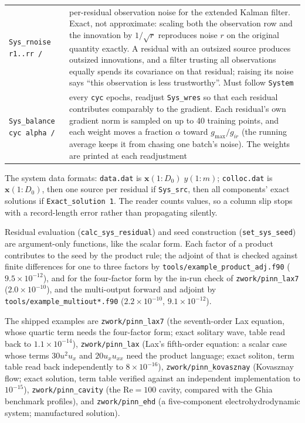 \documentclass[10pt,a4paper]{article}
\newcommand{\code}[1]{\texttt{#1}}
\newcommand{\mi}[1]{\boldsymbol{#1}}
\begin{document}
\begin{longtable}{@{}p{}p{}@{}}
\code{Sys\_rnoise r1..rr /} & per-residual observation noise for the extended Kalman filter. Exact, not approximate: scaling both the observation row and the innovation by $1/\sqrt{r}$ reproduces noise $r$ on the original quantity exactly. A residual with an outsized source produces outsized innovations, and a filter trusting all observations equally spends its covariance on that residual; raising its noise says ``this observation is less trustworthy''. Must follow \code{System}\\
\code{Sys\_balance cyc alpha /} & every \code{cyc} epochs, readjust \code{Sys\_wres} so that each residual contributes comparably to the gradient. Each residual's own gradient norm is sampled on up to 40 training points, and each weight moves a fraction $\alpha$ toward $g_{\max}/g_{ir}$ (the running average keeps it from chasing one batch's noise). The weights are printed at each readjustment\\
\bottomrule
\end{longtable}

The system data formats: \code{data.dat} is
$\mi{x}(1{:}D_0)\;y(1{:}m)$; \code{colloc.dat} is $\mi{x}(1{:}D_0)$,
then one source per residual if \code{Sys\_src}, then all components'
exact solutions if \code{Exact\_solution 1}. The reader counts
values, so a column slip stops with a record-length error rather than
propagating silently.

Residual evaluation (\code{calc\_sys\_residual}) and seed
construction (\code{set\_sys\_seed}) are argument-only functions,
like the scalar form. Each factor of a product contributes to the
seed by the product rule; the adjoint of that is checked against
finite differences for one to three factors by
\code{tools/example\_product\_adj.f90} ($9.5\times10^{-12}$), and for
the four-factor form by the in-run check of \code{zwork/pinn\_lax7}
($2.0\times10^{-10}$), and the
multi-output forward and adjoint by
\code{tools/example\_multiout*.f90} ($2.2\times10^{-10}$,
$9.1\times10^{-12}$).

The shipped examples are \code{zwork/pinn\_lax7} (the seventh-order Lax equation, whose quartic term needs the four-factor form; exact solitary wave, table read back to $1.1\times10^{-14}$), \code{zwork/pinn\_lax} (Lax's fifth-order
equation: a scalar case whose terms $30u^2u_x$ and $20u_xu_{xx}$ need
the product language; exact soliton, term table read back
independently to $8\times10^{-16}$),
\code{zwork/pinn\_kovasznay} (Kovasznay flow; exact solution, term
table verified against an independent implementation to $10^{-15}$),
\code{zwork/pinn\_cavity} (the Re$=100$ cavity, compared with the
Ghia benchmark profiles), and \code{zwork/pinn\_ehd} (a
five-component electrohydrodynamic system; manufactured solution).
\end{document}
